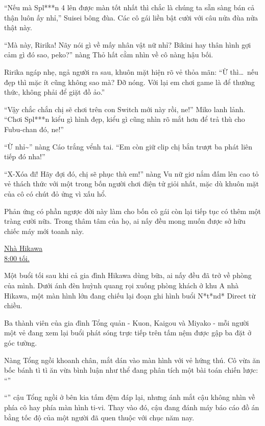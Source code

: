 \documentclass[../main.tex]{subfiles}
\begin{document}
``Nếu mà Spl***n 4 lên được màn tốt nhất thì chắc là chúng ta sẵn sàng bán cả thận luôn ấy nhỉ,'' Suisei bông đùa. Các cô gái liền bật cười với câu nửa đùa nửa thật này.

``Mà này, Ririka! Nãy nói gì về mấy nhân vật nữ nhỉ? Bikini hay thân hình gợi cảm gì đó sao, peko?'' nàng Thỏ hất cằm nhìn về cô nàng hậu bối.

Ririka ngáp nhẹ, ngả người ra sau, khuôn mặt hiện rõ vẻ thỏa mãn: ``Ừ thì\dots\ nếu đẹp thì mặc ít cũng không sao mà? Đỡ nóng. Với lại em chơi game là để thưởng thức, không phải để giặt đồ ảo.''

``Vậy chắc chắn chị sẽ chơi trên con Switch mới này rồi, ne!'' Miko lanh lảnh. ``Chơi Spl***n kiểu gì hình đẹp, kiểu gì cũng nhìn rõ mắt hơn để trả thù cho Fubu-chan đó, ne!''

``Ừ nhỉ\~{}'' nàng Cáo trắng vểnh tai. ``Em còn giữ clip chị bắn trượt ba phát liên tiếp đó nha!''

``X-Xóa đi! Hãy đợi đó, chị sẽ phục thù em!'' nàng Vu nữ giơ nắm đấm lên cao tỏ vẻ thách thức với một trong bốn người chơi điện tử giỏi nhất, mặc dù khuôn mặt của cô có chút đỏ ửng vì xấu hổ.

Phản ứng có phần ngược đời này làm cho bốn cô gái còn lại tiếp tục có thêm một tràng cười nữa. Trong thâm tâm của họ, ai nấy đều mong muốn được sở hữu chiếc máy mới toanh này.

\begin{center}
    \uline{Nhà Hikawa\\8:00 tối.}
\end{center}

Một buổi tối sau khi cả gia đình Hikawa dùng bữa, ai nấy đều đã trở về  phòng của mình. Dưới ánh đèn huỳnh quang rọi xuống phòng khách ở khu A nhà Hikawa, một màn hình lớn đang chiếu lại đoạn ghi hình buổi N*t*nd* Direct từ chiều.

Ba thành viên của gia đình Tổng quản - Kuon, Kaigou và Miyako - mỗi người một vẻ đang xem lại buổi phát sóng trực tiếp trên tấm nệm được gập ba đặt ở góc tường.

Nàng Tổng ngồi khoanh chân, mắt dán vào màn hình với vẻ hứng thú. Cô vừa ăn bốc bánh tì tì ăn vừa bình luận như thể đang phân tích một bài toán chiến lược: ``''

``'' cậu Tổng ngồi ở bên kia tấm đệm đáp lại, nhưng ánh mắt cậu không nhìn về phía cô hay phía màn hình ti-vi. Thay vào đó, cậu đang đánh máy báo cáo đồ án bằng tốc độ của một người đã quen thuộc với chục năm nay.
\end{document}
